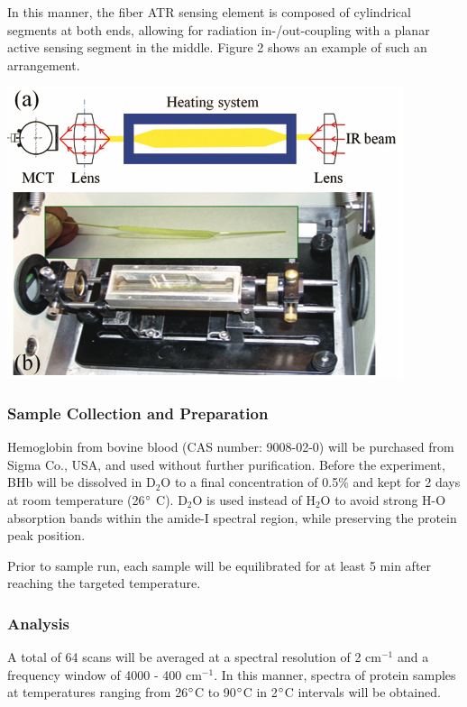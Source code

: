 \documentclass{article}
\begin{document}
In this manner, the fiber ATR sensing element is composed of cylindrical
segments at both ends, allowing for radiation in-/out-coupling with a planar active
sensing segment in the middle. Figure 2 shows an example of such an arrangement.
\begin{center}
    \includegraphics[scale=0.5]{segment}
\end{center}


\subsubsection*{Sample Collection and Preparation}
Hemoglobin from bovine blood (CAS number: 9008-02-0) will be purchased from Sigma
Co., USA, and used without further purification.
Before the experiment, BHb will be dissolved in D$_2$O to a final concentration
of 0.5\% and kept for 2 days at room temperature (26$\degree$ C). D$_2$O is used
instead of H$_2$O to avoid strong H-O absorption bands within the amide-I
spectral region, while preserving the protein peak position.

Prior to sample run, each sample will be equilibrated for at least 5 min after
reaching the targeted temperature. 

\subsubsection*{Analysis}
A total of 64 scans will be averaged at a spectral resolution of 2 cm$^{-1}$ and a
frequency window of 4000 - 400 cm$^{-1}$. 
In this manner, spectra of protein samples at temperatures ranging from
26$\degree$C to 90$\degree$C in 2$\degree$C intervals will be obtained.
\end{document}
